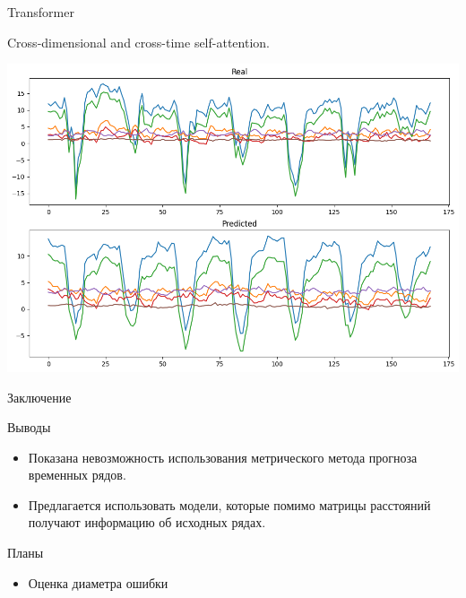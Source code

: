 \documentclass{beamer}
\begin{document}
\begin{frame}{Transformer}

Cross-dimensional and cross-time self-attention.

\includegraphics[width=1\textwidth]{transformer}

\end{frame}
\begin{frame}{Заключение}
    \begin{block}{Выводы}
    \begin{itemize}
        \item Показана невозможность использования метрического метода прогноза временных рядов.
        \item Предлагается использовать модели, которые помимо матрицы расстояний получают информацию об исходных рядах.
    \end{itemize}
    \end{block}
    \begin{block}{Планы}
    \begin{itemize}
    	\item Оценка диаметра ошибки
    \end{itemize}
    \end{block}
\end{frame}
\end{document}
